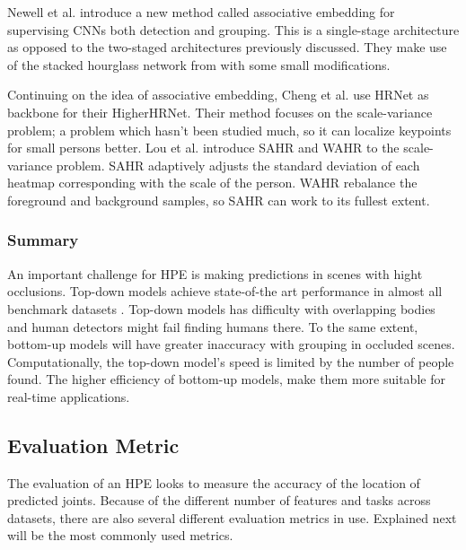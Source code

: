 Newell et al. \cite{Newell2016-2} introduce a new method called associative embedding for supervising \glspl{CNN} both detection and grouping.
This is a single-stage architecture as opposed to the two-staged architectures previously discussed.
They make use of the stacked hourglass network from \cite{Newell2016} with some small modifications.

Continuing on the idea of associative embedding, Cheng et al. \cite{Cheng2019} use HRNet \cite{Sun2019} as backbone for their HigherHRNet.
Their method focuses on the scale-variance problem; a problem which hasn't been studied much, so it can localize keypoints for small persons better.
Lou et al. \cite{Lou2020} introduce \gls{SAHR} and \gls{WAHR} to the scale-variance problem.
\gls{SAHR} adaptively adjusts the standard deviation of each heatmap corresponding with the scale of the person.
\gls{WAHR} rebalance the foreground and background samples, so \gls{SAHR} can work to its fullest extent.

\subsubsection{Summary}
An important challenge for \gls{HPE} is making predictions in scenes with hight occlusions.
Top-down models achieve state-of-the art performance in almost all benchmark datasets \cite{Chen2000}.
Top-down models has difficulty with overlapping bodies and human detectors might fail finding humans there.
To the same extent, bottom-up models will have greater inaccuracy with grouping in occluded scenes.
Computationally, the top-down model's speed is limited by the number of people found.
The higher efficiency of bottom-up models, make them more suitable for real-time applications.

\subsection{Evaluation Metric}
The evaluation of an \gls{HPE} looks to measure the accuracy of the location of predicted joints.
Because of the different number of features and tasks across datasets, there are also several different evaluation metrics in use.
Explained next will be the most commonly used metrics.

